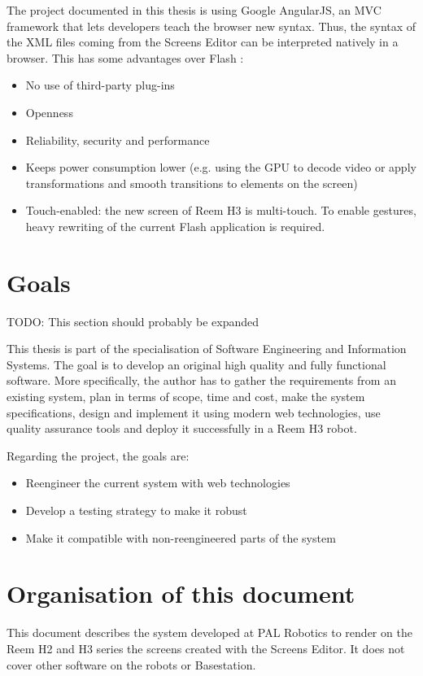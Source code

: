 The project documented in this thesis is using Google AngularJS, an \ac{MVC} framework that lets developers teach the browser new syntax. 
Thus, the syntax of the \ac{XML} files coming from the Screens Editor can be interpreted natively in a browser. 
This has some advantages over Flash \cite{Jobs:ThoughtsOnFlash}:
\begin{itemize}
    \item No use of third-party plug-ins
    \item Openness
    \item Reliability, security and performance
    \item Keeps power consumption lower (e.g. using the GPU to decode video or apply transformations and smooth transitions to elements on the screen)
    \item Touch-enabled: the new screen of Reem H3 is multi-touch. To enable gestures, heavy rewriting of the current Flash application is required.
\end{itemize}


\section{Goals}
TODO: This section should probably be expanded

This thesis is part of the specialisation of Software Engineering and Information Systems. 
The goal is to develop an original high quality and fully functional software. 
More specifically, the author has to gather the requirements from an existing system, plan in terms of scope, time and cost, make the system specifications, design and implement it using modern web technologies, use quality assurance tools and deploy it successfully in a Reem H3 robot.

Regarding the project, the goals are:
\begin{itemize}
\item Reengineer the current system with web technologies
\item Develop a testing strategy to make it robust
\item Make it compatible with non-reengineered parts of the system
\end{itemize}

\section{Organisation of this document}
This document describes the system developed at PAL Robotics to render on the Reem H2 and H3 series the screens created with the Screens Editor.
It does not cover other software on the robots or Basestation.


